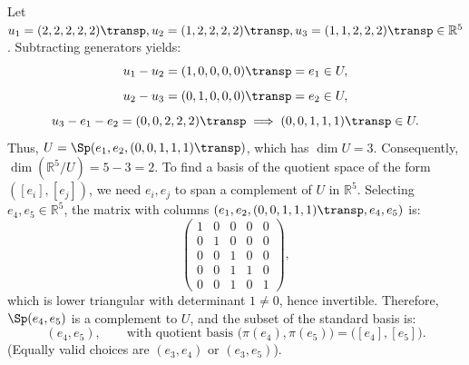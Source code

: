\begin{exercisesolution*}
\label{sol:basis_of_quotient_space_r5}
Let $u_1 = (2, 2, 2, 2, 2)\transp, u_2 = (1, 2, 2, 2, 2)\transp, u_3 = (1, 1, 2, 2, 2)\transp \in \mathbb{R}^5$.
Subtracting generators yields:
\[
u_1 - u_2 = (1, 0, 0, 0, 0)\transp = e_1 \in U,
\]
\[
u_2 - u_3 = (0, 1, 0, 0, 0)\transp = e_2 \in U,
\]
\[
u_3 - e_1 - e_2 = (0, 0, 2, 2, 2)\transp \implies (0, 0, 1, 1, 1)\transp \in U.
\]
Thus, $U = \Sp(e_1, e_2, (0, 0, 1, 1, 1)\transp)$, which has $\dim U = 3$.
Consequently, $\dim(\mathbb{R}^5/U) = 5 - 3 = 2$.
To find a basis of the quotient space of the form $([e_i], [e_j])$, we need $e_i, e_j$ to span a complement of $U$ in $\mathbb{R}^5$.
Selecting $e_4, e_5 \in \mathbb{R}^5$, the matrix with columns $(e_1, e_2, (0,0,1,1,1)\transp, e_4, e_5)$ is:
\[
\begin{pmatrix}
1 & 0 & 0 & 0 & 0 \\
0 & 1 & 0 & 0 & 0 \\
0 & 0 & 1 & 0 & 0 \\
0 & 0 & 1 & 1 & 0 \\
0 & 0 & 1 & 0 & 1
\end{pmatrix},
\]
which is lower triangular with determinant $1 \ne 0$, hence invertible.
Therefore, $\Sp(e_4, e_5)$ is a complement to $U$, and the subset of the standard basis is:
\[
(e_4, e_5), \qquad \text{with quotient basis } \big(\pi(e_4), \pi(e_5)\big) = \big([e_4], [e_5]\big).
\]
(Equally valid choices are $(e_3, e_4)$ or $(e_3, e_5)$).
\end{exercisesolution*}
